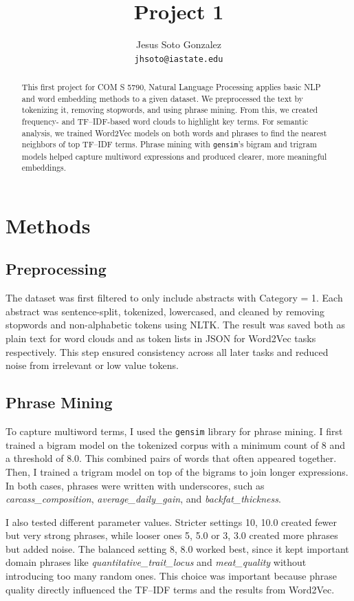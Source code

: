 \documentclass[11pt]{article}
\title{Project 1}
\author{Jesus Soto Gonzalez \\
  \texttt{jhsoto@iastate.edu}}
\begin{document}
\maketitle

\begin{abstract}
This first project for COM S 5790, Natural Language Processing applies basic NLP and word embedding methods 
to a given dataset. We preprocessed the text by tokenizing it, removing stopwords, and using phrase mining. 
From this, we created frequency- and TF--IDF-based word clouds to highlight key terms. 
For semantic analysis, we trained Word2Vec models on both words and phrases to find the nearest neighbors 
of top TF--IDF terms. Phrase mining with \texttt{gensim}'s bigram and trigram models helped capture multiword 
expressions and produced clearer, more meaningful embeddings.
\end{abstract}

\section{Methods}

\subsection{Preprocessing}
The dataset was first filtered to only include abstracts with Category = 1. 
Each abstract was sentence-split, tokenized, lowercased, and cleaned by removing stopwords and non-alphabetic 
tokens using NLTK. The result was saved both as plain text for word clouds and as token lists in JSON for 
Word2Vec tasks respectively. This step ensured consistency across all later tasks and reduced noise 
from irrelevant or low value tokens.

\subsection{Phrase Mining}
To capture multiword terms, I used the \texttt{gensim} library for phrase mining. 
I first trained a bigram model on the tokenized corpus with a minimum count of 8 and a threshold of 8.0. 
This combined pairs of words that often appeared together. 
Then, I trained a trigram model on top of the bigrams to join longer expressions. 
In both cases, phrases were written with underscores, such as \textit{carcass\_composition}, 
\textit{average\_daily\_gain}, and \textit{backfat\_thickness}.  

I also tested different parameter values. 
Stricter settings 10, 10.0 created fewer but very strong phrases, while looser ones 5, 5.0 or 3, 3.0 
created more phrases but added noise. The balanced setting 8, 8.0 worked best, since it kept important 
domain phrases like \textit{quantitative\_trait\_locus} and \textit{meat\_quality} without introducing too 
many random ones. This choice was important because phrase quality directly influenced the TF--IDF terms 
and the results from Word2Vec.
\end{document}
